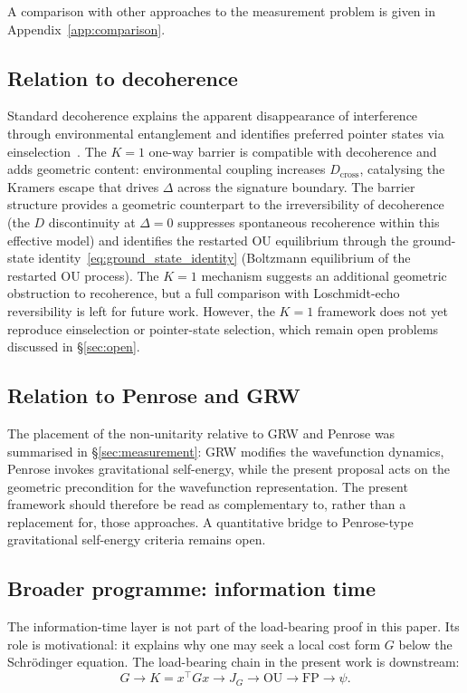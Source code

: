 \documentclass[11pt,a4paper]{article}
\theoremstyle{definition}
\begin{document}
A comparison with other approaches to the measurement problem is given in Appendix~\ref{app:comparison}.

\subsection{Relation to decoherence}

Standard decoherence explains the apparent disappearance of interference through environmental entanglement and identifies preferred pointer states via einselection~\cite{Zurek,Schlosshauer}. The $K{=}1$ one-way barrier is compatible with decoherence and adds geometric content: environmental coupling increases $D_{\mathrm{cross}}$, catalysing the Kramers escape that drives $\Delta$ across the signature boundary. The barrier structure provides a geometric counterpart to the irreversibility of decoherence (the $D$ discontinuity at $\Delta = 0$ suppresses spontaneous recoherence within this effective model) and identifies the restarted OU equilibrium through the
ground-state identity~\eqref{eq:ground_state_identity} (Boltzmann equilibrium of the restarted OU process). The $K{=}1$ mechanism suggests an additional geometric obstruction to recoherence, but a full comparison with Loschmidt-echo reversibility is left for future work. However, the $K{=}1$ framework does not yet reproduce einselection or pointer-state selection, which remain open problems discussed in \S\ref{sec:open}.

\subsection{Relation to Penrose and GRW}

The placement of the non-unitarity relative to GRW and Penrose was
summarised in \S\ref{sec:measurement}: GRW modifies the wavefunction
dynamics, Penrose invokes gravitational self-energy, while the present
proposal acts on the geometric precondition for the wavefunction
representation. The present framework should therefore be read as
complementary to, rather than a replacement for, those approaches. A
quantitative bridge to Penrose-type gravitational self-energy criteria
remains open.

\subsection{Broader programme: information time}

The information-time layer is not part of the load-bearing proof in this
paper. Its role is motivational: it explains why one may seek a local
cost form $G$ below the Schr\"odinger equation. The load-bearing chain in
the present work is downstream:
\[
G \longrightarrow K=x^\top Gx \longrightarrow J_G
\longrightarrow \mathrm{OU}
\longrightarrow \mathrm{FP}
\longrightarrow \psi .
\]
\end{document}
